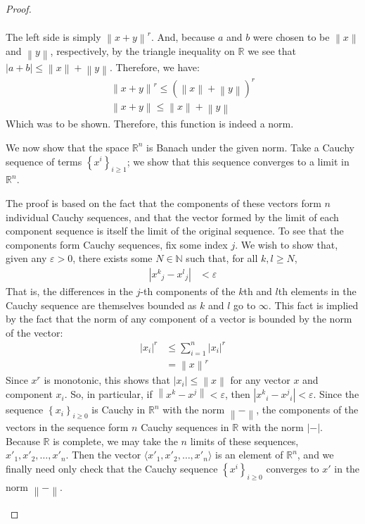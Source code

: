 \documentclass[12pt]{article}
\newcommand{\N}{\mathbb{N}}
\newcommand{\R}{\mathbb{R}}
\theoremstyle{definition}
\begin{document}
\begin{proof}
\begin{enumerate}[label=(\roman*)]
\begin{itemize}
\begin{align*}
			\end{align*}
			The left side is simply $\left \lVert { x+y } \right \lVert^r $. And, because $a$ and $b$ were chosen to be $\left \lVert { x } \right \lVert $ and $\left \lVert { y } \right \lVert $, respectively, by the triangle inequality on $\R$ we see that $\left \lvert {  a+b} \right \lvert \leq \left \lVert { x } \right \lVert  + \left \lVert { y } \right \lVert $. Therefore, we have:
			\begin{align*}
				\left \lVert { x+y } \right \lVert^r \leq \left( \left \lVert { x } \right \lVert +\left \lVert { y } \right \lVert  \right)^r\\
				\left \lVert { x+y } \right \lVert \leq \left \lVert { x } \right \lVert +\left \lVert { y } \right \lVert 
			\end{align*}Which was to be shown. Therefore, this function is indeed a norm.
		\end{itemize}
		We now show that the space $\R^n$ is Banach under the given norm. Take a Cauchy sequence of terms $\left\{ x^i \right\}_{i\geq 1}$; we show that this sequence converges to a limit in $\R^n$. 
		\par The proof is based on the fact that the components of these vectors form $n$ individual Cauchy sequences, and that the vector formed by the limit of each component sequence is itself the limit of the original sequence. To see that the components form Cauchy sequences, fix some index $j$. We wish to show that, given any $\varepsilon > 0$, there exists some $N \in \N$ such that, for all $k, l \geq N$, 
		\begin{align*}
			\left \lvert { {x^k}_j } - {x^l}_j \right \lvert &< \varepsilon
		\end{align*}
		That is, the differences in the $j$-th components of the $k$th and $l$th elements in the Cauchy sequence are themselves bounded as $k$ and $l$ go to $\infty$. This fact is implied by the fact that the norm of any component of a vector is bounded by the norm of the vector:
		\begin{align*}
			\left \lvert { x_i } \right \lvert^r &\leq \sum_{i=1}^n \left \lvert { x_i } \right \lvert^r\\
			&= \left \lVert { x } \right \lVert^r
		\end{align*}
		Since $x^r$ is monotonic, this shows that $\left \lvert { x_i } \right \lvert \leq \left \lVert { x } \right \lVert $ for any vector $x$ and component $x_i$. So, in particular, if $\left \lVert { x^k - x^j } \right \lVert < \varepsilon$, then $\left \lvert { {x^k}_i - {x^j}_i } \right \lvert < \varepsilon$. Since the sequence $\left\{ x_i \right\}_{i\geq 0}$ is Cauchy in $\R^n$ with the norm $\left \lVert { - } \right \lVert $, the components of the vectors in the sequence form $n$ Cauchy sequences in $\R$ with the norm $\left \lvert {  - } \right \lvert $. Because $\R$ is complete, we may take the $n$ limits of these sequences, $x'_1, x'_2, \dots, x'_n$. Then the vector $\langle x'_1, x'_2, \dots, x'_n\rangle $ is an element of $\R^n$, and we finally need only check that the Cauchy sequence $\left\{ x^i \right\}_{i\geq 0}$ converges to $x'$ in the norm $\left \lVert { - } \right \lVert $.

\end{enumerate}
\end{proof}
\end{document}
